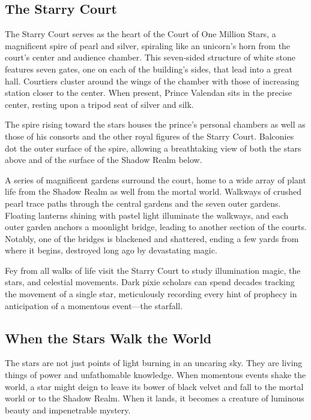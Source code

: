 \documentclass[10pt,a4paper,twoside,bg=print,twocolumn,openany,nodeprecatedcode]{dndbook}
\begin{document}
\subsection{The Starry Court}
The Starry Court serves as the heart of the Court of One Million Stars, a magnificent spire of pearl and silver, spiraling like an unicorn's horn from the court's center and audience chamber. This seven-sided structure of white stone features seven gates, one on each of the building's sides, that lead into a great hall. Courtiers cluster around the wings of the chamber with those of increasing station closer to the center. When present, Prince Valendan sits in the precise center, resting upon a tripod seat of silver and silk.

The spire rising toward the stars houses the prince's personal chambers as well as those of his consorts and the other royal figures of the Starry Court. Balconies dot the outer surface of the spire, allowing a breathtaking view of both the stars above and of the surface of the Shadow Realm below.

A series of magnificent gardens surround the court, home to a wide array of plant life from the Shadow Realm as well from the mortal world. Walkways of crushed pearl trace paths through the central gardens and the seven outer gardens. Floating lanterns shining with pastel light illuminate the walkways, and each outer garden anchors a moonlight bridge, leading to another section of the courts. Notably, one of the bridges is blackened and shattered, ending a few yards from where it begins, destroyed long ago by devastating magic.

Fey from all walks of life visit the Starry Court to study illumination magic, the stars, and celestial movements. Dark pixie scholars can spend decades tracking the movement of a single star, meticulously recording every hint of prophecy in anticipation of a momentous event—the starfall.

\subsection{When the Stars Walk the World}
The stars are not just points of light burning in an uncaring sky. They are living things of power and unfathomable knowledge. When momentous events shake the world, a star might deign to leave its bower of black velvet and fall to the mortal world or to the Shadow Realm. When it lands, it becomes a creature of luminous beauty and impenetrable mystery.
\end{document}
